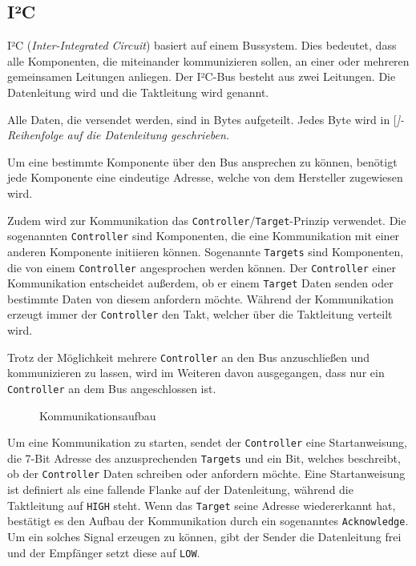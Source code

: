 \subsection{I²C}

I²C (\textit{Inter-Integrated Circuit}) basiert auf einem Bussystem.
Dies bedeutet, dass alle Komponenten, die miteinander kommunizieren sollen, an einer oder mehreren gemeinsamen Leitungen anliegen.
Der I²C-Bus besteht aus zwei Leitungen.
Die Datenleitung wird  und die Taktleitung wird  genannt.

Alle Daten, die versendet werden, sind in Bytes aufgeteilt.
Jedes Byte wird in [\itshape]-Reihenfolge auf die Datenleitung geschrieben.

Um eine bestimmte Komponente über den Bus ansprechen zu können, benötigt jede Komponente eine eindeutige Adresse, welche von dem Hersteller zugewiesen wird.

Zudem wird zur Kommunikation das \texttt{Controller}/\texttt{Target}-Prinzip verwendet.
Die sogenannten \texttt{Controller} sind Komponenten, die eine Kommunikation mit einer anderen Komponente initiieren können.
Sogenannte \texttt{Targets} sind Komponenten, die von einem \texttt{Controller} angesprochen werden können.
Der \texttt{Controller} einer Kommunikation entscheidet außerdem, ob er einem \texttt{Target} Daten senden oder bestimmte Daten von diesem anfordern möchte.
Während der Kommunikation erzeugt immer der \texttt{Controller} den Takt, welcher über die Taktleitung verteilt wird.

Trotz der Möglichkeit mehrere \texttt{Controller} an den Bus anzuschließen und kommunizieren zu lassen, wird im Weiteren davon ausgegangen, dass nur ein \texttt{Controller} an dem Bus angeschlossen ist.

\begin{wrapfigure}{r}{.45\textwidth}
	\centering
	\scalebox{1.25}{}
	
	\caption{Kommunikationsaufbau}
	\label{i2c-start}
\end{wrapfigure}
Um eine Kommunikation zu starten, sendet der \texttt{Controller} eine Startanweisung, die 7-Bit Adresse des anzusprechenden \texttt{Targets} und ein Bit, welches beschreibt, ob der \texttt{Controller} Daten schreiben oder anfordern möchte.
Eine Startanweisung ist definiert als eine fallende Flanke auf der Datenleitung, während die Taktleitung auf \texttt{HIGH} steht.
Wenn das \texttt{Target} seine Adresse wiedererkannt hat, bestätigt es den Aufbau der Kommunikation durch ein sogenanntes \texttt{Acknowledge}.
Um ein solches Signal erzeugen zu können, gibt der Sender die Datenleitung frei und der Empfänger setzt diese auf \texttt{LOW}.

